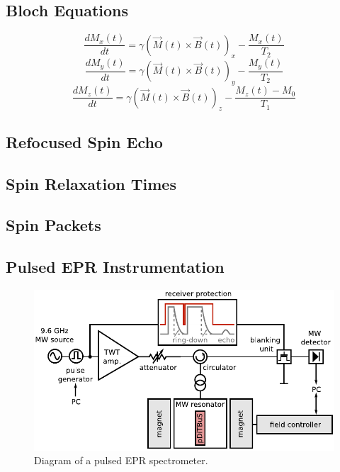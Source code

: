 \subsection{Bloch Equations}
\begin{equation}
\label{eq:Bloch}
\frac{dM_x(t)}{dt} = \gamma\left(\vec{M}(t)\times\vec{B}(t)\right)_x - \frac{M_x(t)}{T_2}
\end{equation}
\begin{equation}
\label{eq:Bloch}
\frac{dM_y(t)}{dt} = \gamma\left(\vec{M}(t)\times\vec{B}(t)\right)_y - \frac{M_y(t)}{T_2}
\end{equation}
\begin{equation}
\label{eq:Bloch}
\frac{dM_z(t)}{dt} = \gamma\left(\vec{M}(t)\times\vec{B}(t)\right)_z - \frac{M_z(t)-M_0}{T_1}
\end{equation}

\subsection{Refocused Spin Echo}
\subsection{Spin Relaxation Times}
\subsection{Spin Packets}

\subsection{Pulsed EPR Instrumentation}

\begin{figure}[h]
\center
	\includegraphics[width=1\textwidth]{./pulse/figures/pEPR_spectrometer_diagram.pdf}
	\caption{Diagram of a pulsed EPR spectrometer.}
	\label{fig:pepr_spectrometer_diagram}
\end{figure}

